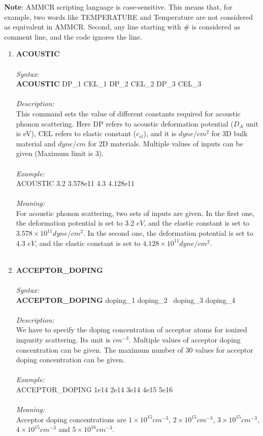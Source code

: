 \documentclass[12pt]{article}
\begin{document}
\textbf{Note}: AMMCR scripting language is case-sensitive. This means that, for example, two words like TEMPERATURE and Temperature are not considered as equivalent in AMMCR.
Second, any line starting with \# is considered as comment line, and the code ignores the line.

\begin{enumerate}
    \item \textbf{ACOUSTIC} \\ \\
    \textit{Syntax}: \\
    \textbf{ACOUSTIC} DP\_1 CEL\_1 DP\_2 CEL\_2 DP\_3 CEL\_3  \\ \\
    \textit{Description:} \\
    This command sets the value of different constants required for acoustic phonon scattering. Here DP refers to acoustic deformation potential ($D_A$ unit is eV), CEL refers to elastic constant ($c_{el}$), and it is $dyne/cm^2$ for 3D bulk material and $dyne/cm$ for 2D materials. Multiple values of inputs can be given (Maximum limit is 3). \\ \\ 
    \textit{Example:}\\
    ACOUSTIC 3.2 3.578e11 4.3 4.128e11 \\ \\
    \textit{Meaning:}\\
    For acoustic phonon scattering, two sets of inputs are given. In the first one, the deformation potential is set to 3.2 $eV$, and the elastic constant is set to $3.578 \times 10^{11} dyne/cm^2 $. In the second one, the deformation potential is set to 4.3 $eV$, and the elastic constant is set to $4.128 \times 10^{11} dyne/cm^2 $. \\ \\
    
    \item \textbf{ACCEPTOR\_DOPING}\\ \\
    \textit{Syntax:} \\
    \textbf{ACCEPTOR\_DOPING} doping\_1 doping\_2 \ doping\_3 doping\_4 \\ \\
    \textit{Description:} \\
    We have to specify the doping concentration of acceptor atoms for ionized impurity scattering. Its unit is $cm^{-3}$. Multiple values of acceptor doping concentration can be given. The maximum number of 30 values for acceptor doping concentration can be given. \\ \\
    \textit{Example:} \\
    ACCEPTOR\_DOPING 1e14 2e14 3e14 4e15 5e16 \\ \\
    \textit{Meaning:} \\ 
    Acceptor doping concentrations are $1 \times 10^{15} cm^{-3}$, $2 \times 10^{15} cm^{-3}$, $3 \times 10^{15} cm^{-3}$, $4 \times 10^{15} cm^{-3}$ and $5 \times 10^{16} cm^{-3}$. \\ \\


\end{enumerate}
\end{document}
